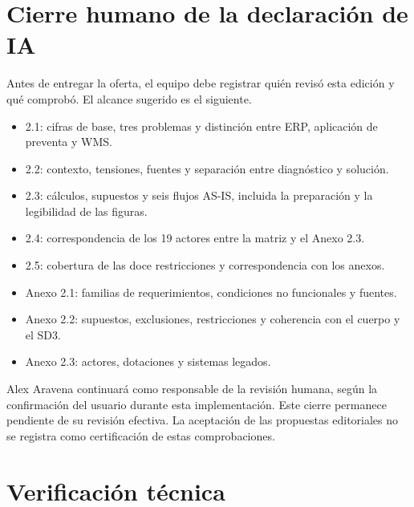 \documentclass[11pt,letterpaper]{article}
\begin{document}
\section*{Cierre humano de la declaración de IA}
Antes de entregar la oferta, el equipo debe registrar quién revisó esta edición y qué comprobó. El alcance sugerido es el siguiente.
\begin{itemize}
\item 2.1: cifras de base, tres problemas y distinción entre ERP, aplicación de preventa y WMS.
\item 2.2: contexto, tensiones, fuentes y separación entre diagnóstico y solución.
\item 2.3: cálculos, supuestos y seis flujos AS-IS, incluida la preparación y la legibilidad de las figuras.
\item 2.4: correspondencia de los 19 actores entre la matriz y el Anexo 2.3.
\item 2.5: cobertura de las doce restricciones y correspondencia con los anexos.
\item Anexo 2.1: familias de requerimientos, condiciones no funcionales y fuentes.
\item Anexo 2.2: supuestos, exclusiones, restricciones y coherencia con el cuerpo y el SD3.
\item Anexo 2.3: actores, dotaciones y sistemas legados.
\end{itemize}
Alex Aravena continuará como responsable de la revisión humana, según la confirmación del usuario durante esta implementación. Este cierre permanece pendiente de su revisión efectiva. La aceptación de las propuestas editoriales no se registra como certificación de estas comprobaciones.

\section*{Verificación técnica}

\end{document}
